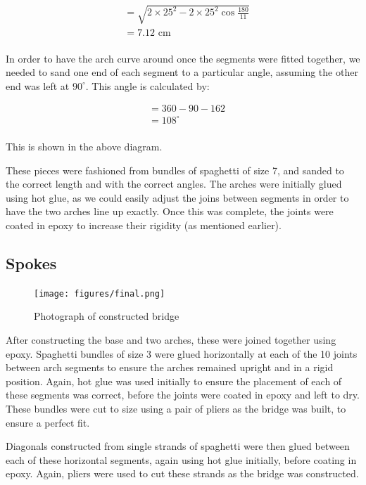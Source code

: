\documentclass[a4paper,11pt]{article}
\begin{document}
$$
\begin{aligned}
& = \sqrt{2 \times 25^2 - 2 \times 25^2 \cos{\frac{180}{11}}} \\
& = 7.12\mbox{ cm} \\
\end{aligned}
$$

In order to have the arch curve around once the segments were fitted together,
we needed to sand one end of each segment to a particular angle, assuming the
other end was left at $90^\circ$.
This angle is calculated by:

$$
\begin{aligned}
& = 360 - 90 - 162 \\
& = 108^\circ \\
\end{aligned}
$$

This is shown in the above diagram.

These pieces were fashioned from bundles of spaghetti of size 7, and sanded to
the correct length and with the correct angles.
The arches were initially glued using hot glue, as we could easily adjust the
joins between segments in order to have the two arches line up exactly.
Once this was complete, the joints were coated in epoxy to increase their
rigidity (as mentioned earlier).


\subsection{Spokes}

\begin{figure}
\begin{center}
\texttt{[image: figures/final.png]}
\end{center}
\caption{Photograph of constructed bridge}
\label{construction:final}
\end{figure}

After constructing the base and two arches, these were joined together using
epoxy.
Spaghetti bundles of size 3 were glued horizontally at each of the 10 joints
between arch segments to ensure the arches remained upright and in a rigid
position.
Again, hot glue was used initially to ensure the placement of each of these
segments was correct, before the joints were coated in epoxy and left to dry.
These bundles were cut to size using a pair of pliers as the bridge was built,
to ensure a perfect fit.

Diagonals constructed from single strands of spaghetti were then glued between
each of these horizontal segments, again using hot glue initially, before
coating in epoxy.
Again, pliers were used to cut these strands as the bridge was constructed.
\end{document}

